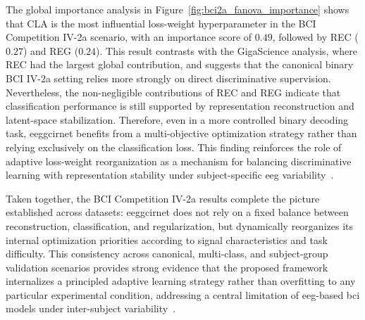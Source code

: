 
{The global importance analysis in Figure~\ref{fig:bci2a_fanova_importance} shows that CLA is the most influential loss-weight hyperparameter in the BCI Competition IV-2a scenario, with an importance score of $0.49$, followed by REC ($0.27$) and REG ($0.24$). This result contrasts with the GigaScience analysis, where REC had the largest global contribution, and suggests that the canonical binary BCI IV-2a setting relies more strongly on direct discriminative supervision. Nevertheless, the non-negligible contributions of REC and REG indicate that classification performance is still supported by representation reconstruction and latent-space stabilization. Therefore, even in a more controlled binary decoding task, \gls{eeggcirnet} benefits from a multi-objective optimization strategy rather than relying exclusively on the classification loss. This finding reinforces the role of adaptive loss-weight reorganization as a mechanism for balancing discriminative learning with representation stability under subject-specific \gls{eeg} variability~\cite{lotte2018review,saha2020intra,Dhanushkodi}.}

Taken together, the BCI Competition IV-2a results complete the picture established across datasets: \gls{eeggcirnet} does not rely on a fixed balance between reconstruction, classification, and regularization, but dynamically reorganizes its internal optimization priorities according to signal characteristics and task difficulty. This consistency across canonical, multi-class, and subject-group validation scenarios provides strong evidence that the proposed framework internalizes a principled adaptive learning strategy rather than overfitting to any particular experimental condition, addressing a central limitation of \gls{eeg}-based \gls{bci} models under inter-subject variability~\cite{lotte2018review,saha2020intra}.


